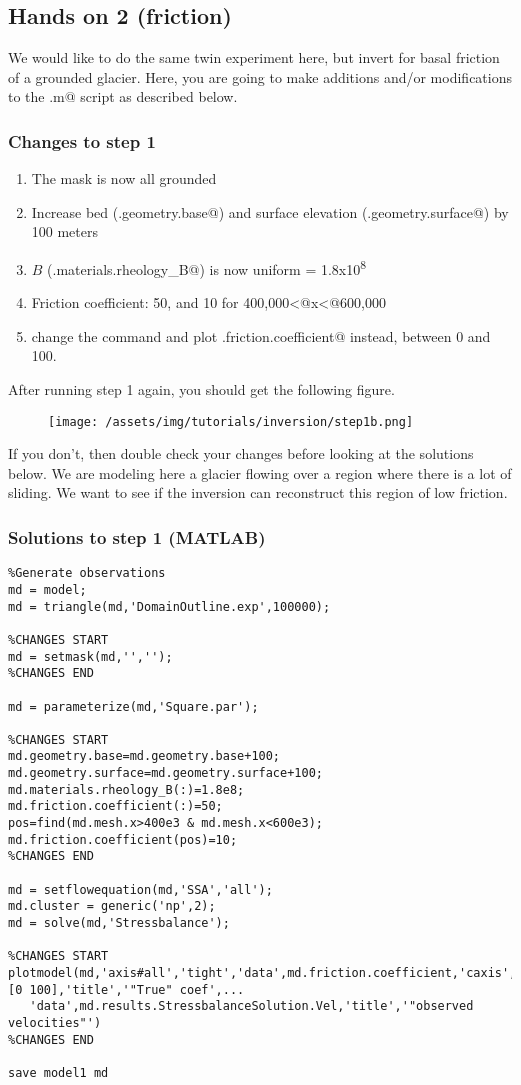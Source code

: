 \subsection{Hands on 2 (friction)} %
We would like to do the same twin experiment here, but invert for basal friction of a grounded glacier. Here, you are going to make additions and/or modifications to the \verb@runme.m@ script as described below.

\subsubsection{Changes to step 1}
\begin{enumerate}
	\item The mask is now all grounded
	\item Increase bed (\verb@md.geometry.base@) and surface elevation (\verb@md.geometry.surface@) by 100 meters
	\item $B$ (\verb@md.materials.rheology_B@) is now uniform = 1.8x10\textsuperscript{8}
	\item Friction coefficient: 50, and 10 for 400,000\verb@<@x\verb@<@600,000
	\item change the \verb@plotmodel@ command and plot \verb@md.friction.coefficient@ instead, between 0 and 100.
\end{enumerate}
After running step 1 again, you should get the following figure.
\begin{figure}[H]
	\begin{center}
		\texttt{[image: /assets/img/tutorials/inversion/step1b.png]}
	\end{center}
\end{figure}
If you don't, then double check your changes before looking at the solutions below. We are modeling here a glacier flowing over a region where there is a lot of sliding. We want to see if the inversion can reconstruct this region of low friction.

\subsubsection{Solutions to step 1 (MATLAB)}
\begin{verbatim}%Generate observations
md = model;
md = triangle(md,'DomainOutline.exp',100000);

%CHANGES START
md = setmask(md,'','');
%CHANGES END

md = parameterize(md,'Square.par');

%CHANGES START
md.geometry.base=md.geometry.base+100;
md.geometry.surface=md.geometry.surface+100;
md.materials.rheology_B(:)=1.8e8;
md.friction.coefficient(:)=50;
pos=find(md.mesh.x>400e3 & md.mesh.x<600e3);
md.friction.coefficient(pos)=10;
%CHANGES END

md = setflowequation(md,'SSA','all');
md.cluster = generic('np',2);
md = solve(md,'Stressbalance');

%CHANGES START
plotmodel(md,'axis#all','tight','data',md.friction.coefficient,'caxis',[0 100],'title','"True" coef',...
   'data',md.results.StressbalanceSolution.Vel,'title','"observed velocities"')
%CHANGES END

save model1 md\end{verbatim}

